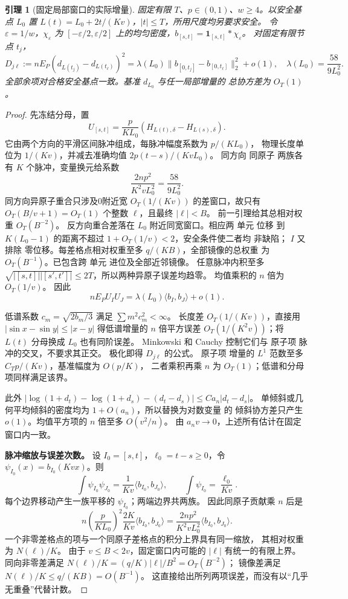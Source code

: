 \documentclass[UTF8,a4paper,11pt,fontset=fandol]{ctexart}
\newtheorem{lemma}{引理}[section]
\theoremstyle{remark}
\begin{document}
\begin{lemma}[固定局部窗口的实际增量]\label{lem:paperlocal}
固定有限 $T$、$p\in(0,1)$、$w\ge4$。以安全基点 $L_0$ 置
$L(t)=L_0+2t/(Kv)$，$|t|\le T$，所用尺度均另要求安全。
令 $\varepsilon=1/w$，$\chi_\varepsilon$ 为 $[-\varepsilon/2,\varepsilon/2]$
上的均匀密度，$b_{[s,t]}=\mathbf1_{[s,t]}*\chi_\varepsilon$。
对固定有限节点 $t_j$，
\[
 D_{j\ell}:=nE_P(d_{L(t_j)}-d_{L(t_\ell)})^2
 =\lambda(L_0)\|b_{[0,t_j]}-b_{[0,t_\ell]}\|_2^2+o(1),
 \quad\lambda(L_0)=\frac{58}{9L_0^2}.
\]
全部余项对合格安全基点一致。基准 $d_{L_0}$ 与任一局部增量的
总协方差为 $O_T(1)$。
\end{lemma}
\begin{proof}
先冻结分母，置
\[
 U_{[s,t]}=\frac p{KL_0}(H_{L(t),\delta}-H_{L(s),\delta}).
\]
它由两个方向的平滑区间脉冲组成，每脉冲幅度系数为 $p/(KL_0)$，
物理长度单位为 $1/(Kv)$，并减去准确均值 $2p(t-s)/(K vL_0)$。
同方向 同原子 两族各有 $K$ 个脉冲，变量换元给系数
\[
 \frac{2np^2}{K^2vL_0^2}=\frac{58}{9L_0^2}.
\]
同方向异原子重合只涉及0附近宽 $O_T(1/(Kv))$ 的差窗口，故只有
$O_T(B/v+1)=O_T(1)$ 个整数 $\ell$，且最终 $|\ell|<B$。
前一引理给其总相对权重 $O_T(B^{-2})$。
反方向重合差落在 $L_0$ 附近同宽窗口。相应两 单元 位移 到
$K(L_0-1)$ 的距离不超过 $1+O_T(1/v)<2$，安全条件使二者均 非缺陷；
$I$ 又排除 零位移。每差格点相对权重至多 $q/(KB)$，全部镜像的总权重
为 $O_T(B^{-1})$。已包含跨 单元 进位及全部近邻镜像。
任意脉冲内积至多 $\sqrt{|[s,t]||[s',t']|}\le2T$，所以两种异原子误差均趋零。
均值乘积的 $n$ 倍为 $O_T(1/v)$。
因此
\[
 nE_PU_IU_J=\lambda(L_0)\langle b_I,b_J\rangle+o(1).
\]

低谱系数 $c_m=\sqrt{2b_m/3}$ 满足 $\sum m^2c_m^2<\infty$。
长度差 $O_T(1/(Kv))$，直接用 $|\sin x-\sin y|\le|x-y|$ 得低谱增量的
$n$ 倍平方误差 $O_T(1/(K^2v))$；将 $L(t)$ 分母换成 $L_0$ 也有同阶误差。
Minkowski 和 Cauchy 控制它们与 原子项 脉冲的交叉，不要求其正交。
极化即得 $D_{j\ell}$ 的公式。
原子项 增量的 $L^1$ 范数至多 $C_Tp/(Kv)$，基准幅度为 $O(p/K)$，
二者乘积再乘 $n$ 为 $O_T(1)$；低谱和分母项同样满足该界。

此外 $|\log(1+d_t)-\log(1+d_s)-(d_t-d_s)|\le Ca_n|d_t-d_s|$。
单倾斜或几何平均倾斜的密度均为 $1+O(a_n)$，所以替换为对数变量 的
倾斜协方差只产生 $o(1)$。均值平方项的 $n$ 倍至多 $O(v^2/n)$。
由 $a_nv\to0$，上述所有估计在固定窗口内一致。

\medskip\noindent\textbf{脉冲缩放与误差次数。}
设 $I_0=[s,t]$，$\ell_0=t-s\ge0$，令
$\psi_{I_0}(x)=b_{I_0}(Kvx)$。则
\[
 \int\psi_{I_0}\psi_{J_0}=\frac1{Kv}\langle b_{I_0},b_{J_0}\rangle,
 \qquad \int\psi_{I_0}=\frac{\ell_0}{Kv}.
\]
每个边界移动产生一族平移的 $\psi_{I_0}$；两端边界共两族。
因此同原子贡献乘 $n$ 后是
\[
 n\left(\frac p{KL_0}\right)^2\frac{2K}{Kv}
 \langle b_{I_0},b_{J_0}\rangle
 =\frac{2np^2}{K^2vL_0^2}\langle b_{I_0},b_{J_0}\rangle.
\]
一个非零差格点的项与一个同原子差格点的积分上界具有同一缩放，
其相对权重为 $N(\ell)/K$。
由于 $v\le B<2v$，固定窗口内可能的 $|\ell|$ 有统一的有限上界。
同向非零差满足
$N(\ell)/K=(q/K)|\ell|/B^2=O_T(B^{-2})$；
镜像差满足 $N(\ell)/K\le q/(KB)=O(B^{-1})$。
这直接给出所列两项误差，而没有以“几乎无重叠”代替计数。


\end{proof}
\end{document}
